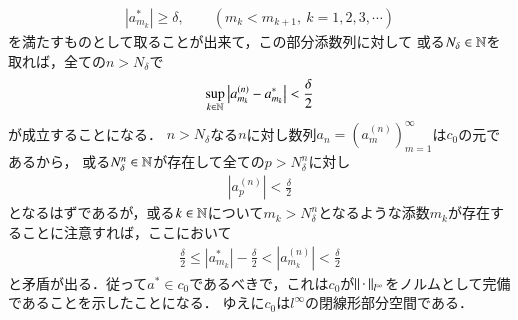 \begin{prf}
\begin{description}
		\begin{align}
			|a_{m_k}^*| \geq \delta, \qquad (m_k < m_{k+1},\ k= 1,2,3,\cdots)
		\end{align}
		を満たすものとして取ることが出来て，この部分添数列に対して
		或る$N_\delta \in \mathbb{N}$を取れば，全ての$n > N_\delta$で
		\begin{align}
			\operatorname*{sup}_{k \in \mathbb{N}} \left|a_{m_k}^{(n)} - a_{m_k}^{*}\right| < \frac{\delta}{2}
		\end{align}
		が成立することになる．
		$n > N_\delta$なる$n$に対し数列$a_n=(a_m^{(n)})_{m=1}^{\infty}$は$c_0$の元であるから，
		或る$N_\delta^n \in \mathbb{N}$が存在して全ての$p > N_\delta^n$に対し
		\begin{align}
			\left|a_p^{(n)}\right| < \frac{\delta}{2}
		\end{align}
		となるはずであるが，或る$k \in \mathbb{N}$について$m_k > N_\delta^n$となるような添数$m_k$が存在することに注意すれば，ここにおいて
		\begin{align}
			\frac{\delta}{2} \leq \left|a_{m_k}^*\right| - \frac{\delta}{2} < \left|a_{m_k}^{(n)}\right| < \frac{\delta}{2}
		\end{align}
		と矛盾が出る．従って$a^* \in c_0$であるべきで，これは$c_0$が$\left\|\, \cdot\, \right\|_{l^{\infty}}$をノルムとして完備であることを示したことになる．
		ゆえに$c_0$は$l^{\infty}$の閉線形部分空間である．
		

\end{description}
\end{prf}
